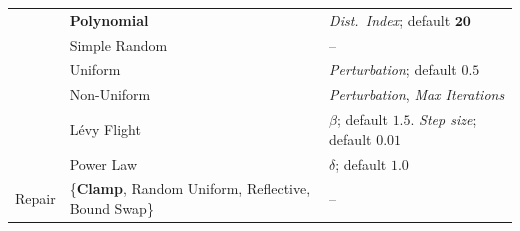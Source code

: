 \documentclass[final,5p,times,twocolumn]{elsarticle}
\begin{document}
\begin{table}[htbp]
\begin{tabular}{lll}
 & \textbf{Polynomial} & \textit{Dist.\ Index}; default $\mathbf{20}$ \\
 & Simple Random & -- \\
 & Uniform & \textit{Perturbation}; default $0.5$ \\
 & Non-Uniform & \textit{Perturbation}, \textit{Max Iterations} \\
 & L\'evy Flight & $\beta$; default $1.5$. \textit{Step size}; default $0.01$ \\
 & Power Law & $\delta$; default $1.0$ \\ \midrule
\multirow{1}{*}{Repair} & \{\textbf{Clamp}, Random Uniform, Reflective, Bound Swap\} & -- \\ \bottomrule
\end{tabular}%
\end{table}



\end{document}

